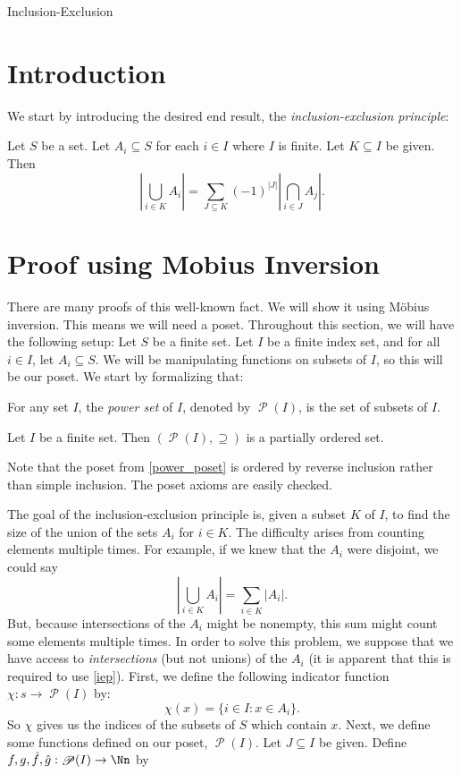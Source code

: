 \documentclass[12pt]{pom_thesis}
\DeclareMathOperator{\ps}{\mathscr{P}}
\begin{document}
\begin{chapter}{Inclusion-Exclusion}
\section{Introduction}
We start by introducing the desired end result, the \emph{inclusion-exclusion principle}:
\begin{thm}\label{iep}
Let $S$ be a set. Let $A_i \subseteq S$ for each $i \in I$ where $I$ is finite. Let $K \subseteq I$ be given. Then
\[
\left|\bigcup_{i \in K}A_i\right| = \sum_{J \subseteq K}(-1)^{|J|}\left|\bigcap_{i \in J}A_j\right|
.\]
\end{thm}
\section{Proof using Mobius Inversion}
There are many proofs of this well-known fact. We will show it using M\"obius inversion. This means we will need a poset. Throughout this section, we will have the following setup: Let $S$ be a finite set. Let $I$ be a finite index set, and for all $i \in I$, let $A_i \subseteq S$. We will be manipulating functions on subsets of $I$, so this will be our poset. We start by formalizing that:

\begin{defn}
For any set $I$, the \emph{power set} of $I$, denoted by $\ps(I)$, is the set of subsets of $I$. 
\end{defn}
\begin{rmk}\label{power_poset}
Let $I$ be a finite set. Then $(\ps(I), \supseteq)$ is a partially ordered set.
\end{rmk}
Note that the poset from \ref{power_poset} is ordered by reverse inclusion rather than simple inclusion. The poset axioms are easily checked.

The goal of the inclusion-exclusion principle is, given a subset $K$ of $I$, to find the size of the union of the sets $A_i$ for $i \in K$. The difficulty arises from counting elements multiple times. For example, if we knew that the $A_i$ were disjoint, we could say
\[
\left|\bigcup_{i \in K}A_i\right| = \sum_{i \in K}\left|A_i\right|.
\]
But, because intersections of the $A_i$ might be nonempty, this sum might count some elements multiple times. In order to solve this problem, we suppose that we have access to \emph{intersections} (but not unions) of the $A_i$ (it is apparent that this is required to use \ref{iep}). First, we define the following indicator function $\chi: s \rightarrow \ps(I)$ by:
\[
\chi(x) = \{i \in I : x \in A_i\}.
\]
So $\chi$ gives us the indices of the subsets of $S$ which contain $x$.  
Next, we define some functions defined on our poset, $\ps(I)$.
Let $J \subseteq I$ be given. Define $f,g,\hat{f}, \hat{g}:\ps(I) \rightarrow \Nn$ by


\end{chapter}
\end{document}

